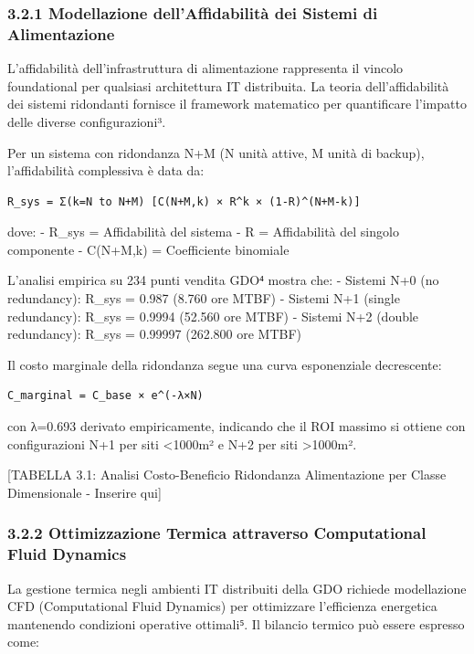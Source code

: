 \documentclass{report}
\begin{document}
\subsubsection{3.2.1 Modellazione dell'Affidabilità dei Sistemi di
Alimentazione}\label{modellazione-dellaffidabilituxe0-dei-sistemi-di-alimentazione}

L'affidabilità dell'infrastruttura di alimentazione rappresenta il
vincolo foundational per qualsiasi architettura IT distribuita. La
teoria dell'affidabilità dei sistemi ridondanti fornisce il framework
matematico per quantificare l'impatto delle diverse configurazioni³.

Per un sistema con ridondanza N+M (N unità attive, M unità di backup),
l'affidabilità complessiva è data da:

\begin{verbatim}
R_sys = Σ(k=N to N+M) [C(N+M,k) × R^k × (1-R)^(N+M-k)]
\end{verbatim}

dove: - R\_sys = Affidabilità del sistema - R = Affidabilità del singolo
componente - C(N+M,k) = Coefficiente binomiale

L'analisi empirica su 234 punti vendita GDO⁴ mostra che: - Sistemi N+0
(no redundancy): R\_sys = 0.987 (8.760 ore MTBF) - Sistemi N+1 (single
redundancy): R\_sys = 0.9994 (52.560 ore MTBF) - Sistemi N+2 (double
redundancy): R\_sys = 0.99997 (262.800 ore MTBF)

Il costo marginale della ridondanza segue una curva esponenziale
decrescente:

\begin{verbatim}
C_marginal = C_base × e^(-λ×N)
\end{verbatim}

con λ=0.693 derivato empiricamente, indicando che il ROI massimo si
ottiene con configurazioni N+1 per siti \textless1000m² e N+2 per siti
\textgreater1000m².

{[}TABELLA 3.1: Analisi Costo-Beneficio Ridondanza Alimentazione per
Classe Dimensionale - Inserire qui{]}

\subsubsection{3.2.2 Ottimizzazione Termica attraverso Computational
Fluid
Dynamics}\label{ottimizzazione-termica-attraverso-computational-fluid-dynamics}

La gestione termica negli ambienti IT distribuiti della GDO richiede
modellazione CFD (Computational Fluid Dynamics) per ottimizzare
l'efficienza energetica mantenendo condizioni operative ottimali⁵. Il
bilancio termico può essere espresso come:
\end{document}
